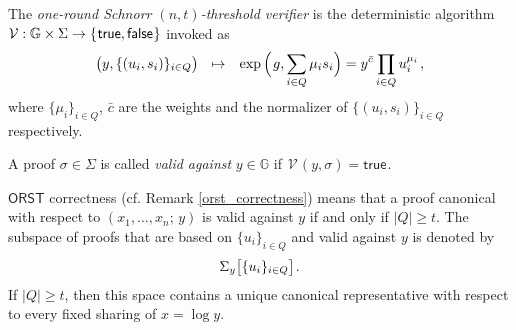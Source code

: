 \documentclass{iacrtrans}
\begin{document}
\begin{defn}\label{orst_verifier}
The \textit{one-round Schnorr $(n, t)$-threshold verifier}
is the deterministic algorithm
$\mathcal{V}: \mathbb{G} \times \Sigma \rightarrow
\{\hspace{0.5pt}\textsf{true}, \textsf{false}\hspace{0.5pt}\}$
invoked as
\vspace{5pt}
\begin{equation*}
\big(y, \{(u_i, s_i)\}_{i \in Q}\big)\
\ \mapsto
\ \hspace{4pt}\exp\Big(\hspace{1pt}g, {\sum_{i \in Q} \mu_i s_i}\Big) =
y ^ {\bar{c}} \prod_{i \in Q} u_i^{\mu_i}
\hspace{1pt},
\vspace{5pt}
\end{equation*}
where $\{\mu_i\}_{i \in Q}$, $\bar{c}$ are
the weights and the normalizer of $\{(u_i, s_i)\}_{i \in Q}$
respectively.
\end{defn}

\begin{defn}\label{orst_validity_definition}
A proof $\sigma \in \Sigma$ is called
\textit{valid against} $y \in \mathbb{G}$ if
$\hspace{1pt}\mathcal{V}\hspace{1pt}(y, \sigma)
= \textsf{true}\hspace{1pt}$.
\end{defn}

\noindent
$\mathsf{ORST}$ correctness
(cf. Remark \ref{orst_correctness})
means that a proof canonical with respect
to $(x_1, \dots, x_n;\hspace{2pt} y)$
is valid against $y$ if and only if $|Q| \ge t$.
The subspace of proofs that are based on
$\{u_i\}_{i \in Q}$ and valid against $y$ is denoted by
\vspace{5pt}
\begin{equation*}\label{orst_valid_proofs_on_commitments_def}
\Sigma_y \big[\{u_i\}_{i \in Q}\big]\hspace{1pt}.
\vspace{5pt}
\end{equation*}
If $|Q| \ge t$, then this space
contains a unique canonical representative
with respect to every fixed sharing of $x = \log y$.
\end{document}
